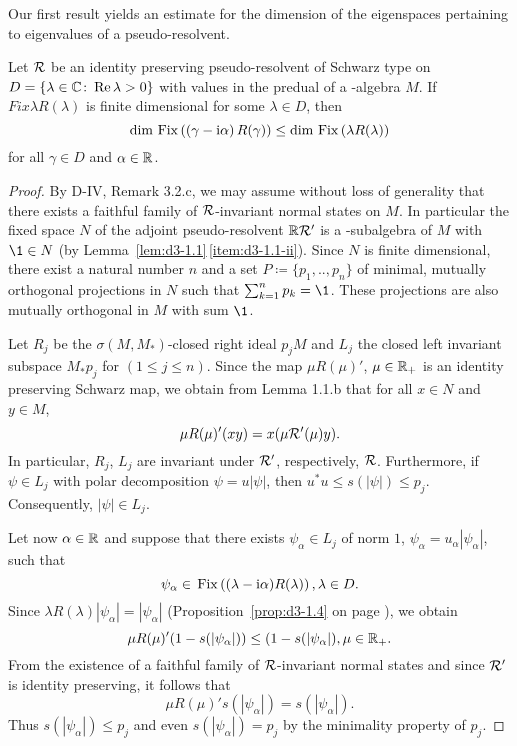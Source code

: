 Our first result yields an estimate for the dimension of the eigenspaces pertaining to eigenvalues of a pseudo-resolvent.
\begin{proposition}\label{prop:d3-2.1}
Let $\mathcal{R}$ be an identity preserving pseudo-resolvent of Schwarz type on $D = \{\lambda \in \mathbb{C} \colon \mathop{}\!\mathrm{Re}\,\lambda > 0\}$ with values in the predual of a \WA-algebra $M$. 
If $Fix{\lambda R(\lambda)}$ is finite dimensional for some $\lambda \in D$, then
\[
\dim \mathop{}\mathrm{Fix}\left(\left( \gamma - \mathrm{i}\alpha \right)R(\gamma)\right) \leq \dim \mathop{}\mathrm{Fix}\left(\lambda R(\lambda)\right)
\]
for all $\gamma \in D$ and $\alpha \in \mathbb{R}$.
\end{proposition}
\begin{proof}
By D-IV, Remark 3.2.c, we may assume without loss of generality that there exists a faithful family of $\mathcal{R}$-invariant normal states on $M$.
In particular the fixed space $N$ of the adjoint pseudo-resolvent $\mathbb{R}\mathcal{R}'$ is a \WA-subalgebra of $M$ with $\1 \in N$ (by Lemma~\ref{lem:d3-1.1}\,\ref{item:d3-1.1-ii}).
Since $N$ is finite dimensional, there exist a natural number $n$ and a set $P \coloneqq \{p_{1}, .., p_{n}\}$ of minimal, mutually orthogonal projections in $N$ such that $\sum_{k=1}^{n} p_{k} = \1$.
These projections are also mutually orthogonal in $M$ with sum $\1$.

Let $R_{j}$ be the $\sigma(M,M_{*})$-closed right ideal $p_{j}M$ and $L_{j}$ the closed left invariant subspace $M_{*}p_{j}$ for $(1 \leq j \leq n)$.
Since the map $\mu R(\mu)'$, $\mu \in \mathbb{R}_{+}$ is an identity preserving Schwarz map, we obtain from Lemma 1.1.b that for all $x \in N$ and $y \in M$,
\[
	\mu R(\mu)'(xy) = x(\mu \mathcal{R}'(\mu)y) .
\]
In particular, $R_{j}$, \resp $L_{j}$ are invariant under $\mathcal{R}'$, respectively, $\mathcal{R}$.
Furthermore, if $\psi \in L_{j}$ with polar decomposition $\psi = u|\psi|$, then $u^{*}u \leq s(|\psi|) \leq p_{j}$.
Consequently, $|\psi| \in L_{j}$.

Let now $\alpha \in \mathbb{R}$ and suppose that there exists $\psi_{\alpha} \in L_{j}$ of norm $ 1 $, $\psi_{\alpha} = u_{\alpha}|\psi_{\alpha}|$, such that
\[
	\psi_{\alpha} \in \mathop{}\mathrm{Fix}\left((\lambda - \mathrm{i}\alpha)R(\lambda)\right) , \lambda \in D .
\]
Since $\lambda R(\lambda)|\psi_{\alpha}| = |\psi_{\alpha}|$ (Proposition~\ref{prop:d3-1.4} on page \pageref{prop:d3-1.4}), we obtain
\[
	\mu R(\mu)'(1-s(|\psi_{\alpha}|)) \leq (1-s(|\psi_{\alpha}|) , \mu \in \mathbb{R}_{+} .
\]
From the existence of a faithful family of $\mathcal{R}$-invariant normal states and since $\mathcal{R}'$ is identity preserving, it follows that
\[
	\mu R(\mu)'s(|\psi_{\alpha}|) = s(|\psi_{\alpha}|) .
\]
Thus $s(|\psi_{\alpha}|) \leq p_{j}$ and even $s(|\psi_{\alpha}|) = p_{j}$ by the minimality property of $p_{j}$.


\end{proof}
